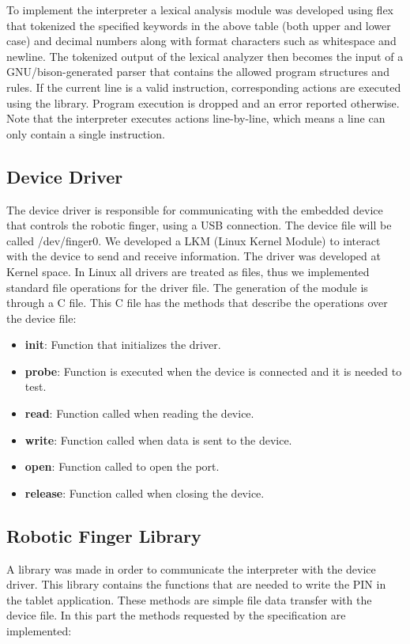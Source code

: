 \documentclass[12pt]{article}
\begin{document}
To implement the interpreter a lexical analysis module was developed using flex that tokenized the specified keywords in the above table (both upper and lower case) and decimal numbers along with format characters such as whitespace and newline. The tokenized output of the lexical analyzer then becomes the input of a GNU/bison-generated parser that contains the allowed program structures and rules. If the current line is a valid instruction, corresponding actions are executed using the library. Program execution is dropped and an error reported otherwise. Note that the interpreter executes actions line-by-line, which means a line can only contain a single instruction.

\subsection{Device Driver}
The device driver is responsible for communicating with the embedded device that controls the robotic finger, using a USB connection.
The device file will be called /dev/finger0. We developed a LKM (Linux Kernel Module) to interact with the device to send and receive information. The driver was developed at Kernel space. In Linux all drivers are treated as files, thus we implemented standard file operations for the driver file.
The generation of the module is through a C file. This C file has the methods that describe the operations over the device file:

\begin{itemize}
\item \textbf{init}: Function that initializes the driver.
\item \textbf{probe}: Function is executed when the device is connected and it is needed to test.
\item \textbf{read}: Function called when reading the device.
\item \textbf{write}: Function called when data is sent to the device.
\item \textbf{open}: Function called to open the port.
\item \textbf{release}: Function called when closing the device.
\end{itemize}

\subsection{Robotic Finger Library}
A library was made in order to communicate the interpreter with the device driver. This library contains the functions that are needed to write the PIN in the tablet application. These methods are simple file data transfer with the device file. In this part the methods requested by the specification are implemented:
\end{document}
